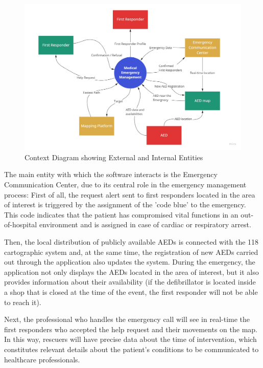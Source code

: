 \documentclass[11pt,a4paper]{article}
\begin{document}
\begin{figure}
    \centering
    \includegraphics[width=\textwidth]{images/context.jpg}
    \caption{Context Diagram showing External and Internal Entities}
    \label{fig:context}
\end{figure}

The main entity with which the software interacts is the Emergency Communication Center, due to its central role in the emergency management process:
%
First of all, the request alert sent to first responders located in the area of interest is triggered by the assignment of the 'code blue' to the emergency.
%
This code indicates that the patient has compromised vital functions in an out-of-hospital environment and is assigned in case of cardiac or respiratory arrest.

Then, the local distribution of publicly available AEDs is connected with the 118 cartographic system and, at the same time, the registration of new AEDs carried out through the application also updates the system. 
%
During the emergency, the application not only displays the AEDs located in the area of interest, but it also provides information about their availability (if the defibrillator is located inside a shop that is closed at the time of the event, the first responder will not be able to reach it).

Next, the professional who handles the emergency call will see in real-time the first responders who accepted the help request and their movements on the map.
%
In this way, rescuers will have precise data about the time of intervention, which constitutes relevant details about the patient's conditions to be communicated to healthcare professionals.
\end{document}
